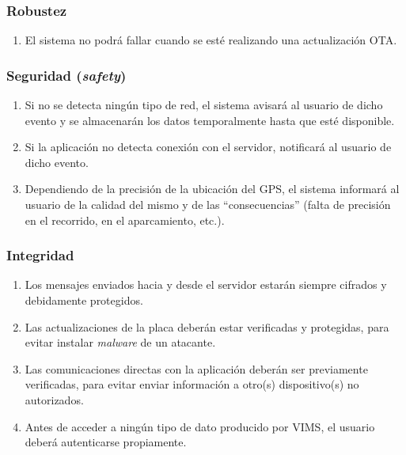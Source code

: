 \subsubsection{Robustez}
\begin{enumerate}[resume, label=\textbf{\texttt{RNF-\arabic*}}]
  \item\label{nf:ota-strength} El sistema no podrá fallar cuando se esté realizando
  una actualización OTA.
\end{enumerate}

\subsubsection{Seguridad (\textit{safety})}
\begin{enumerate}[resume, label=\textbf{\texttt{RNF-\arabic*}}]
  \item\label{nf:err-mobile} Si no se detecta ningún tipo de red, el sistema 
  avisará al usuario de dicho evento y se almacenarán los datos temporalmente hasta
  que esté disponible.
  \item\label{nf:err-app} Si la aplicación no detecta conexión con el servidor,
  notificará al usuario de dicho evento.
  \item\label{nf:err-gps} Dependiendo de la precisión de la ubicación del GPS,
  el sistema informará al usuario de la calidad del mismo y de las ``consecuencias''
  (falta de precisión en el recorrido, en el aparcamiento, etc.).
\end{enumerate}

\subsubsection{Integridad}
\begin{enumerate}[resume, label=\textbf{\texttt{RNF-\arabic*}}]
  \item\label{nf:enc} Los mensajes enviados hacia y desde el servidor estarán siempre
  cifrados y debidamente protegidos.
  \item\label{nf:ota-int} Las actualizaciones de la placa deberán estar verificadas
  y protegidas, para evitar instalar \textit{malware} de un atacante.
  \item\label{nf:s2a-int} Las comunicaciones directas con la aplicación deberán
  ser previamente verificadas, para evitar enviar información a otro(s) dispositivo(s)
  no autorizados.
  \item\label{nf:auth} Antes de acceder a ningún tipo de dato producido por \ac{VIMS},
  el usuario deberá autenticarse propiamente.
\end{enumerate}

